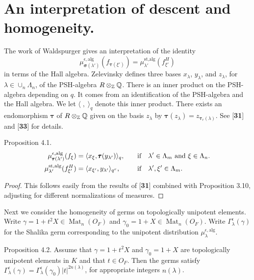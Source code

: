 \documentclass{amsart}
\begin{document}
\section{{An interpretation of descent and homogeneity.}}

\medskip
\noindent
The work of Waldspurger gives an interpretation of the identity
  $$ \mu_{\pmb\sigma(\lambda')}^{\epsilon,\text{alg}} 
    (f_{\pmb\tau(\xi')}) =
    \mu_{\lambda'}^{\text{st,alg}}(f_{\xi'}^{H}) $$
in terms of the Hall algebra.
Zelevinsky defines three bases
  $ x_{\lambda} $,
  $ y_{\lambda} $, and
  $ z_{\lambda} $,
  for $\lambda \in \cup_n \Lambda_n$,
of the PSH-algebra $R\otimes_{\Bbb Z} {\Bbb Q}$.
There is an inner product on the PSH-algebra depending on $q$. It comes
from an identification of the PSH-algebra and the Hall algebra.
We let
  $ \langle \;,\; \rangle_q $
denote this inner product.
There exists an endomorphism
  $ \pmb\tau $
of 
  $ R \otimes_{\Bbb Z} {\Bbb Q} $
given on the basis
  $ z_{\lambda} $
by
  $ \pmb\tau (z_{\lambda}) =
    z_{\pmb\tau_r (\lambda) } $.
See [{\bf 31}] and [{\bf 33}] for details.


\proclaim Proposition {4.1}.
%
\begin{alignat*}{2}
  \mu_{\pmb\tau(\lambda')}^{\epsilon, \text{{\rm alg}}} (f_{\xi})
&=
  \langle
    x_{\xi}, \pmb\tau (y_{\lambda'}) 
  \rangle_q, \quad
&&\text{{\rm if}} \quad
  \lambda' \in \Lambda_m \text{\rm \ and }
  \xi \in \Lambda_n.
\\
  \mu_{\lambda'}^{\text{{\rm st,alg}}} (f^H_{\xi'})
&=
  \langle
    x_{\xi'}, y_{\lambda'} 
  \rangle_{q^r}, \quad
&&\text{{\rm if}} \quad
  \lambda', \xi' \in \Lambda_m.
\end{alignat*}
%
\finishproclaim

\begin{proof}
  This follows easily from the results of
  [{\bf 31}] combined with Proposition 3.10, adjusting
for different normalizations of measures.
\end{proof}

Next we consider the homogeneity of germs on topologically 
  unipotent elements.
Write
  $ \gamma = 1 + t^2 X  \in \operatorname{Mat}_n (O_F) $
and
  $ \gamma_0 = 1 + X \in \operatorname{Mat}_n (O_F) $.
Write $\Gamma_\lambda^\epsilon(\gamma)$ for the Shalika germ
corresponding to the unipotent distribution $\mu_\lambda^{\epsilon,\text{alg}}$.

\proclaim Proposition {4.2}.
Assume that 
  $ \gamma =1+t^2X$
and
  $ \gamma_0 =1+X$
are topologically unipotent elements in $K$ and that 
  $ t \in O_F $.
Then the germs satisfy
  $ \Gamma_{\lambda}^{\epsilon} (\gamma) =
    \Gamma_{\lambda}^{\epsilon} (\gamma_0) 
    |t|^{2n (\lambda)} $,
for appropriate integers
  $ n(\lambda) $.
\finishproclaim
\end{document}

